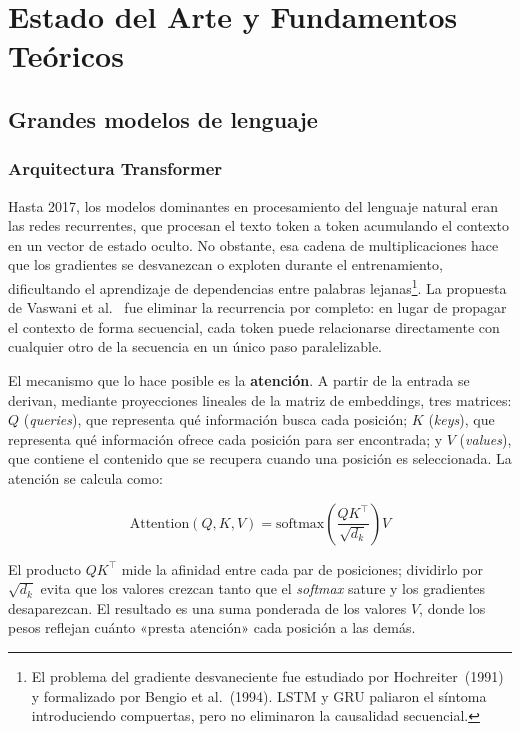 \chapter{Estado del Arte y Fundamentos Teóricos}
\label{ch:estado-arte}

\section{Grandes modelos de lenguaje}

\subsection{Arquitectura Transformer}

Hasta 2017, los modelos dominantes en procesamiento del lenguaje natural eran las redes
recurrentes, que procesan el texto token a token acumulando el contexto en un vector de estado
oculto. No obstante, esa cadena de multiplicaciones hace que los gradientes se desvanezcan o
exploten durante el entrenamiento, dificultando el aprendizaje de dependencias entre palabras
lejanas\footnote{%
  El problema del gradiente desvaneciente fue estudiado por Hochreiter~(1991) y formalizado por
  Bengio et al.~(1994). LSTM y GRU paliaron el síntoma introduciendo compuertas, pero no
  eliminaron la causalidad secuencial.%
}. La propuesta de Vaswani et al.~\cite{vaswani2017attention} fue eliminar la recurrencia por
completo: en lugar de propagar el contexto de forma secuencial, cada token puede relacionarse
directamente con cualquier otro de la secuencia en un único paso paralelizable.

El mecanismo que lo hace posible es la \textbf{atención}. A partir de la entrada se derivan,
mediante proyecciones lineales de la matriz de embeddings, tres matrices: $Q$ (\textit{queries}),
que representa qué información busca cada posición; $K$ (\textit{keys}), que representa qué
información ofrece cada posición para ser encontrada; y $V$ (\textit{values}), que contiene el
contenido que se recupera cuando una posición es seleccionada. La atención se calcula como:

\begin{equation}
  \text{Attention}(Q, K, V) = \text{softmax}\!\left(\frac{QK^\top}{\sqrt{d_k}}\right)V
  \label{eq:attention}
\end{equation}

El producto $QK^\top$ mide la afinidad entre cada par de posiciones; dividirlo por $\sqrt{d_k}$
evita que los valores crezcan tanto que el \textit{softmax} sature y los gradientes desaparezcan.
El resultado es una suma ponderada de los valores $V$, donde los pesos reflejan cuánto «presta
atención» cada posición a las demás.


